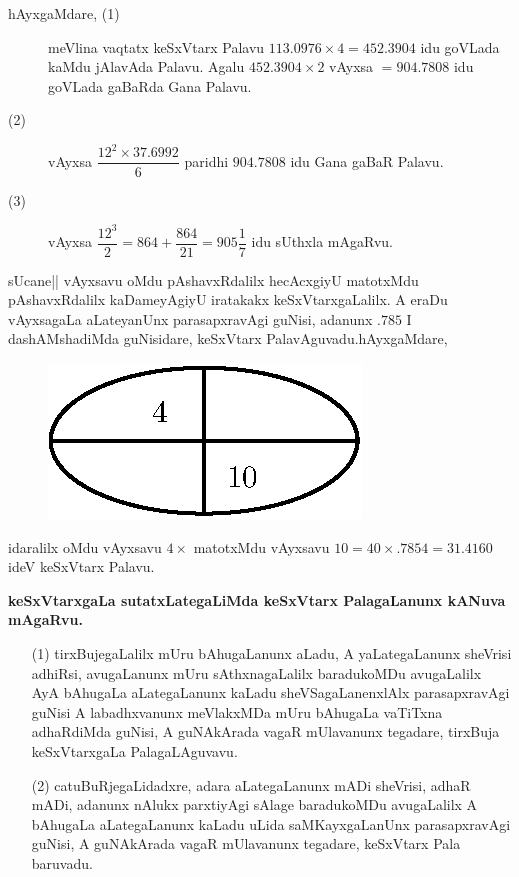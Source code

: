 \begin{description}
\item[\textmd{hAyxgaMdare,} \rm(1)]
meVlina vaqtatx keSxVtarx Palavu $113.0976\times 4=452.3904$ idu
goVLada kaMdu jAlavAda Palavu. Agalu $452.3904\times 2$ vAyxsa
$=904.7808$ idu goVLada gaBaRda Gana Palavu.

\item[\rm(2)] vAyxsa $\dfrac{12^{2}\times 37.6992}{6}$ paridhi
$904.7808$ idu Gana gaBaR Palavu.

\item[\rm(3)] vAyxsa
$\dfrac{12^{3}}{2}=864+\dfrac{864}{21}=905\dfrac{1}{7}$ idu sUthxla mAgaRvu.
\end{description}

sUcane|| vAyxsavu oMdu pAshavxRdalilx hecAcxgiyU matotxMdu
pAshavxRdalilx kaDameyAgiyU iratakakx keSxVtarxgaLalilx. A eraDu
vAyxsagaLa aLateyanUnx parasapxravAgi guNisi, adanunx $.785$ I
dashAMshadiMda guNisidare, keSxVtarx PalavAguvadu.\quad hAyxgaMdare,
\begin{figure}[H]
\centering
\includegraphics{figure/fig23.eps}
\end{figure}

idaralilx oMdu vAyxsavu $4\times$ matotxMdu vAyxsavu $10=40\times
.7854=31.4160$ ideV keSxVtarx Palavu.

\medskip
\begin{center}
{\bf keSxVtarxgaLa sutatxLategaLiMda keSxVtarx PalagaLanunx kANuva mAgaRvu.}
\end{center}

\begin{itemize}
\item[\rm(1)] tirxBujegaLalilx mUru bAhugaLanunx aLadu, A
yaLategaLanunx sheVrisi adhiRsi, avugaLanunx mUru sAthxnagaLalilx
baradukoMDu avugaLalilx AyA bAhugaLa aLategaLanunx kaLadu
sheVSagaLanenxlAlx parasapxravAgi guNisi A labadhxvanunx meVlakxMDa
mUru bAhugaLa vaTiTxna adhaRdiMda guNisi, A guNAkArada vagaR
mUlavanunx tegadare, tirxBuja keSxVtarxgaLa PalagaLAguvavu.

\item[\rm(2)] catuBuRjegaLidadxre, adara aLategaLanunx mADi sheVrisi,
adhaR mADi, adanunx nAlukx parxtiyAgi sAlage baradukoMDu avugaLalilx A
bAhugaLa aLategaLanunx kaLadu uLida saMKayxgaLanUnx parasapxravAgi
guNisi, A guNAkArada vagaR mUlavanunx tegadare, keSxVtarx Pala
baruvadu. 
\end{itemize}

